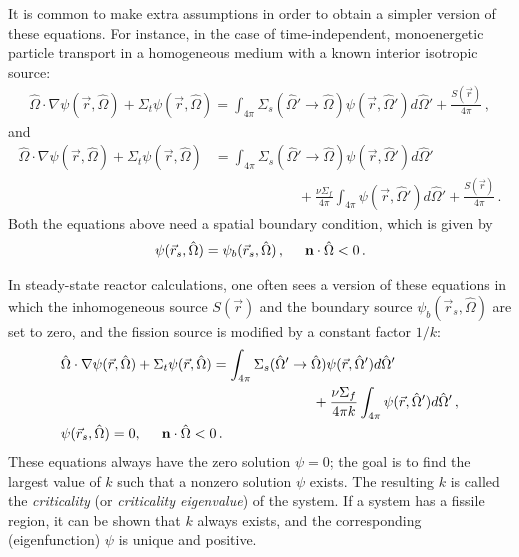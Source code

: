 \documentclass[12pt]{article}
\newcommand{\rvec}{\ensuremath{\vec{r}}}
\newcommand{\omvec}{\ensuremath{\hat{\Omega}}}
\begin{document}
It is common to make extra assumptions in order to obtain a simpler version of these equations. For instance, in the case of time-independent, monoenergetic particle transport in a homogeneous medium with a known interior isotropic source:
\begin{align*}
\omvec\cdot  \nabla \psi(\rvec,\omvec) +
 \Sigma_t\psi(\rvec,\omvec)
=
\int_{4\pi}\Sigma_s(\omvec'\rightarrow\omvec)
\psi(\rvec,\omvec')d\omvec'+\frac{S(\rvec)}{4\pi}\,,
\end{align*}
and 
\begin{align*}
\omvec\cdot  \nabla \psi(\rvec,\omvec) +
 \Sigma_t\psi(\rvec,\omvec)%
 &=
\int_{4\pi}\Sigma_s(\omvec'\rightarrow\omvec)
\psi(\rvec,\omvec')d\omvec'\\&\quad\quad\quad\quad\quad\quad
 +\frac{\nu\Sigma_f}{4\pi}\int_{4\pi}
\psi(\rvec,\omvec')d\omvec'+\frac{S(\rvec)}{4\pi}\,.\nonumber
\end{align*}
Both the equations above need a spatial boundary condition, which is given by
\begin{align*}
\psi(\rvec_s,\omvec) = \psi_b(\rvec_s,\omvec)\,, \hspace{0.5 cm} \textbf{n} \cdot \omvec <0\,.
\end{align*}

In steady-state reactor calculations, one often sees a version of these equations in which the inhomogeneous source $S(\rvec)$ and the boundary source $\psi_b(\rvec_s,\omvec)$ are set to zero, and the fission source is modified by a constant factor $1/k$:
\begin{align*}
&\omvec\cdot  \nabla \psi(\rvec,\omvec) +
 \Sigma_t\psi(\rvec,\omvec)%
 =
\int_{4\pi}\Sigma_s(\omvec'\rightarrow\omvec)
\psi(\rvec,\omvec')d\omvec'\\&\quad\quad\quad\quad\quad\quad\quad\quad\quad\quad\quad\quad\quad\quad\quad\quad\quad\quad
 +\frac{\nu\Sigma_f}{4\pi k}\int_{4\pi}
\psi(\rvec,\omvec')d\omvec'\,,\nonumber\\
&\psi(\rvec_s,\omvec) = 0, \hspace{0.5 cm} \textbf{n} \cdot \omvec <0\,.
\end{align*}
These equations always have the zero solution $\psi = 0$; the goal is to find the largest value of $k$ such that a nonzero solution $\psi$ exists. The resulting $k$ is called the \textit{criticality} (or \textit{criticality eigenvalue}) of the system. If a system has a fissile region, it can be shown that $k$ always exists, and the corresponding (eigenfunction) $\psi$ is unique and positive.
\end{document}
